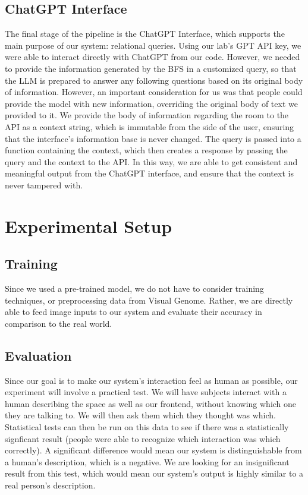 \documentclass[letterpaper, 10 pt, conference]{ieeeconf}  %
\begin{document}
    \subsection*{ChatGPT Interface}
        The final stage of the pipeline is the ChatGPT Interface, which supports the main purpose of our system: relational queries. Using our lab's GPT API key, we were able to interact directly with ChatGPT from our code. However, we needed to provide the information generated by the BFS in a customized query, so that the LLM is prepared to answer any following questions based on its original body of information. However, an important consideration for us was that people could provide the model with new information, overriding the original body of text we provided to it. We provide the body of information regarding the room to the API as a context string, which is immutable from the side of the user, ensuring that the interface's information base is never changed. The query is passed into a function containing the context, which then creates a response by passing the query and the context to the API. In this way, we are able to get consistent and meaningful output from the ChatGPT interface, and ensure that the context is never tampered with.


\section{Experimental Setup}
\subsection*{Training}
    Since we used a pre-trained model, we do not have to consider training techniques, or preprocessing data from Visual Genome. Rather, we are directly able to feed image inputs to our system and evaluate their accuracy in comparison to the real world.

\subsection*{Evaluation}

    Since our goal is to make our system's interaction feel as human as possible, our experiment will involve a practical test. We will have subjects interact with a human describing the space as well as our frontend, without knowing which one they are talking to. We will then ask them which they thought was which. Statistical tests can then be run on this data to see if there was a statistically signficant result (people were able to recognize which interaction was which correctly). A significant difference would mean our system is distinguishable from a human's description, which is a negative. We are looking for an insignificant result from this test, which would mean our system's output is highly similar to a real person's description. 
\end{document}
